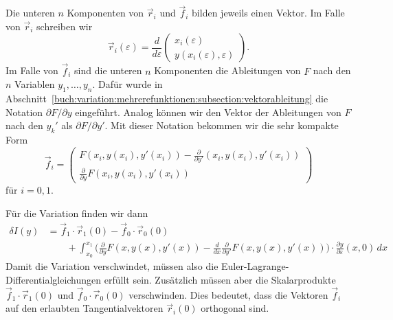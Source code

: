 Die unteren $n$ Komponenten von $\vec{r}_i$ und $\vec{f}_i$ bilden jeweils
einen Vektor.
Im Falle von $\vec{r}_i$ schreiben wir
\[
\vec{r}_i(\varepsilon)
=
\frac{d}{d\varepsilon}
\begin{pmatrix}
x_i(\varepsilon)\\
y(x_i(\varepsilon),\varepsilon)
\end{pmatrix}.
\]
Im Falle von $\vec{f}_i$ sind die unteren $n$ Komponenten
die Ableitungen von $F$ nach den $n$ Variablen $y_1,\dots,y_n$.
Dafür wurde in
Abschnitt~\ref{buch:variation:mehrerefunktionen:subsection:vektorableitung}
die Notation $\partial F/\partial y$ eingeführt.
Analog können wir den Vektor der Ableitungen von $F$ nach den
$y_k'$ als $\partial F/\partial y'$.
Mit dieser Notation bekommen wir die sehr kompakte Form
\[
\vec{f}_i
=
\begin{pmatrix}
\displaystyle
F(x_i,y(x_i),y'(x_i)) - \frac{\partial}{\partial y'}(x_i,y(x_i),y'(x_i))
\\[5pt]
\displaystyle
\frac{\partial}{\partial y} F(x_i,y(x_i),y'(x_i))
\end{pmatrix}
\]
für $i=0,1$.

Für die Variation finden wir dann
\begin{align*}
\delta I(y)
&=
\vec{f}_1\cdot \vec{r}_1(0)
-
\vec{f}_0\cdot \vec{r}_0(0)
\\
&\qquad
+
\int_{x_0}^{x_1}
\biggl(
\frac{\partial}{\partial y}F(x,y(x),y'(x))
-
\frac{d}{dx}
\frac{\partial}{\partial y'}F(x,y(x),y'(x))
\biggr)
\cdot
\frac{\partial y}{\partial\varepsilon}(x,0)
\,dx
\end{align*}
Damit die Variation verschwindet, müssen also die
Euler-Lagrange-Differentialgleichungen erfüllt sein.
Zusätzlich müssen aber die Skalarprodukte
$\vec{f}_1\cdot \vec{r}_1(0)$
und
$\vec{f}_0\cdot \vec{r}_0(0)$
verschwinden.
Dies bedeutet, dass die Vektoren $\vec{f}_i$ auf den erlaubten
Tangentialvektoren $\vec{r}_i(0)$ orthogonal sind.





